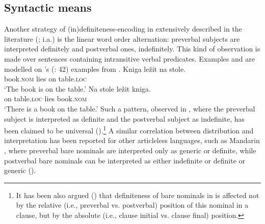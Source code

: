 \documentclass[output=paper]{langscibook}
\begin{document}
\subsection{Syntactic means}
Another strategy of (in)definiteness-encoding in  extensively described in the literature (\citealt{Pospelov1970,Fursenko1970,Chvany1973}; %
i.a.) is the linear word order alternation:
preverbal subjects are interpreted definitely and postverbal ones, indefinitely. This kind of observation is made over sentences containing intransitive verbal predicates. Examples  and  are modelled on \citeauthor{Kramsky1972}'s (\citeyear{Kramsky1972}: 42) examples from .%
\ea
\ea \label{ex:seres:9}
\gll Kniga			ležit	na	stole.\\
book.\textsc{nom} 	lies	on	table.\textsc{loc}\\
\glt `The book is on the table.'
\ex \label{ex:seres:10}
\gll Na		stole			ležit	kniga.\\
on	table.\textsc{loc} 	lies	book.\textsc{nom}\\
\glt `There is a book on the table.'
\z \z
\noindent Such a pattern, observed in , where the preverbal subject is interpreted as definite and the postverbal subject as indefinite, has been claimed to be universal (\citealt{Leiss2007}).\footnote{It has been also argued (\citealt{Simik.Burianova2020}) that definiteness of bare nominals in  is affected not by the relative (i.e., preverbal vs. postverbal) position of this nominal in a clause, but by the absolute (i.e., clause initial vs. clause final) position.}  A similar correlation between distribution and interpretation has been reported for
other articleless languages,
such as Mandarin , where preverbal bare nominals are interpreted only as generic or definite,
while postverbal bare nominals can be interpreted as either indefinite or definite or generic (\citealt{Cheng.Sybesma2014}).
\end{document}
